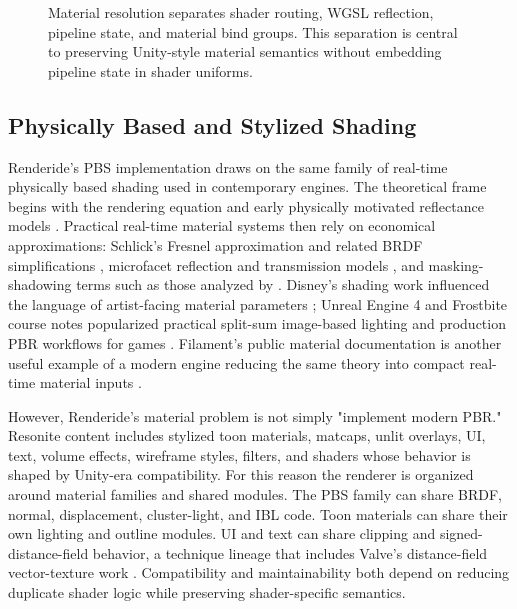 \documentclass[acmtog,screen,nonacm]{acmart}
\begin{document}
\begin{figure}
  \centering
  
  \caption{Material resolution separates shader routing, WGSL reflection, pipeline state, and material bind groups. This separation is central to preserving Unity-style material semantics without embedding pipeline state in shader uniforms.}
  \label{fig:materials}
\end{figure}

\subsection{Physically Based and Stylized Shading}

Renderide's PBS implementation draws on the same family of real-time physically based shading used in contemporary engines. The theoretical frame begins with the rendering equation and early physically motivated reflectance models \citep{kajiya1986renderingEquation,cookTorrance1982reflectance}. Practical real-time material systems then rely on economical approximations: Schlick's Fresnel approximation and related BRDF simplifications \citep{schlick1994brdf}, microfacet reflection and transmission models \citep{walter2007microfacet}, and masking-shadowing terms such as those analyzed by \citet{heitz2014microfacet}. Disney's shading work influenced the language of artist-facing material parameters \citep{burley2012disney}; Unreal Engine 4 and Frostbite course notes popularized practical split-sum image-based lighting and production PBR workflows for games \citep{karis2013real,lagarde2014frostbitePbr}. Filament's public material documentation is another useful example of a modern engine reducing the same theory into compact real-time material inputs \citep{filamentMaterials}.

However, Renderide's material problem is not simply "implement modern PBR." Resonite content includes stylized toon materials, matcaps, unlit overlays, UI, text, volume effects, wireframe styles, filters, and shaders whose behavior is shaped by Unity-era compatibility. For this reason the renderer is organized around material families and shared modules. The PBS family can share BRDF, normal, displacement, cluster-light, and IBL code. Toon materials can share their own lighting and outline modules. UI and text can share clipping and signed-distance-field behavior, a technique lineage that includes Valve's distance-field vector-texture work \citep{green2007sdfText}. Compatibility and maintainability both depend on reducing duplicate shader logic while preserving shader-specific semantics.
\end{document}
